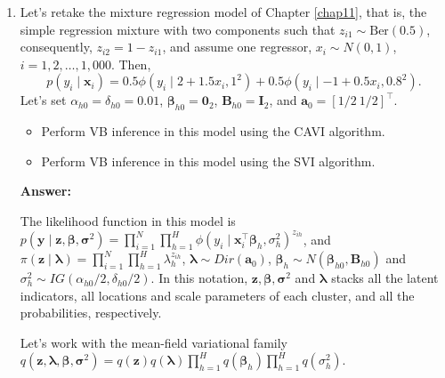 \begin{enumerate}[leftmargin=*]
\item Let's retake the mixture regression model of Chapter \ref{chap11}, that is, the simple regression mixture with two components such that $z_{i1}\sim \text{Ber}(0.5)$, consequently, $z_{i2}=1-z_{i1}$, and assume one regressor, $x_i\sim N(0,1)$, $i=1,2,\dots,1,000$. Then, 
$$p(y_i \mid \boldsymbol{x}_i) = 
0.5 \phi(y_i \mid 2+1.5x_i,1^2)+0.5 \phi(y_i \mid -1+0.5x_i,0.8^2).$$
Let's set $\alpha_{h0}=\delta_{h0}=0.01$, $\boldsymbol{\beta}_{h0}=\boldsymbol{0}_2$, $\boldsymbol{B}_{h0}=\boldsymbol{I}_2$, and $\boldsymbol{a}_0=[1/2 \ 1/2]^{\top}$.

\begin{itemize}
	\item Perform VB inference in this model using the CAVI algorithm.
	\item Perform VB inference in this model using the SVI algorithm.
\end{itemize}

\textbf{Answer:}

The likelihood function in this model is $p(\bm{y}\mid \bm{z},\bm{\beta},\bm{\sigma}^2)=\prod_{i=1}^N\prod_{h=1}^H\phi(y_i\mid\bm{x}_i^{\top}\bm{\beta}_h,\sigma_h^2)^{z_{ih}}$, and $\pi(\bm{z}\mid\bm{\lambda})=\prod_{i=1}^N\prod_{h=1}^H\lambda_h^{z_{ih}}$, $\bm{\lambda}\sim Dir(\bm{a}_0)$, $\bm{\beta}_h\sim N(\bm{\beta}_{h0},\bm{B}_{h0})$ and $\sigma_h^2\sim IG(\alpha_{h0}/2,\delta_{h0}/2)$. In this notation, $\bm{z},\bm{\beta},\bm{\sigma}^2$ and $\bm{\lambda}$ stacks all the latent indicators, all locations and scale parameters of each cluster, and all the probabilities, respectively. 

Let's work with the mean-field variational family $q(\bm{z},\bm{\lambda},\bm{\beta},\bm{\sigma}^2)=q(\bm{z})q(\bm{\lambda})\prod_{h=1}^H q(\bm{\beta}_h)\prod_{h=1}^H q({\sigma}^2_h)$.


\end{enumerate}
